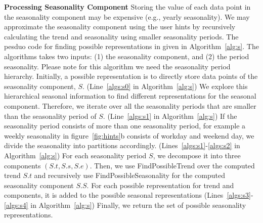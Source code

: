 \documentclass{sigmod}
\begin{document}
{\bf  Processing Seasonality Component}
\label{sec:seasonal}
Storing the value of each data point in the seasonality component may be expensive (e.g., yearly seasonality).  We may approximate the seasonality component using the user hints by 
recursively calculating the trend and seasonality using smaller seasonality periods. 
The pesduo code for finding possible representations in given in Algorithm~\ref{alg:s}. The algorithms takes two inputs: (1) the seasonality component, and (2) the period seasonality. Please note for this algorithm we need the seasonality  period hierarchy.
Initially, a possible representation is to directly store  data points  of the seasonality component, $S$. (Line~\ref{algs:s0} in Algorithm~\ref{alg:s})
We explore this hierarchical seasonal information to find different representations for the seasonal component. Therefore, we iterate over all the seasonality periods that are smaller than the seasonality period of $S$.
(Line~\ref{algs:s1} in Algorithm~\ref{alg:s})
If the seasonality period consists of  more  than one seasonality period,  for example a weekly seasonality in  figure~\ref{fig:hints}b consists of workday and weekend day, we divide the seasonality into partitions accordingly. (Lines~\ref{algs:s1}-\ref{algs:s2} in Algorithm~\ref{alg:s}) For each seasonality period $S$, we decompose it into three components $(S.t,S.s,S.e)$. Then,  we use FindPossibleTrend over the computed trend $S.t$ and recursively use FindPossibleSeasonality for the computed seasonality component $S.S$. For each possible representation for trend and components, it is added to the possible seasonal representations  (Lines~\ref{algs:s3}-\ref{algs:s4} in Algorithm~\ref{alg:s}) Finally, we return the set of possible seasonality representations. 
 

\end{document}
